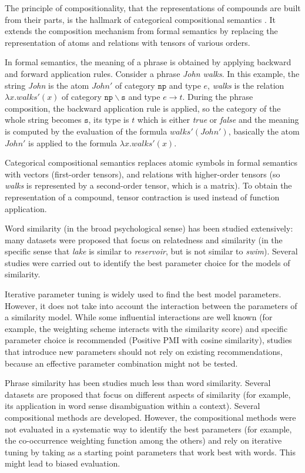 The principle of compositionality, that the representations of compounds are built from their parts, is the hallmark of categorical compositional semantics \cite{DBLP:journals/corr/abs-1003-4394}. It extends the composition mechanism from formal semantics by replacing the representation of atoms and relations with tensors of various orders.

In formal semantics, the meaning of a phrase is obtained by applying backward and forward application rules. Consider a phrase \textit{John walks}. In this example, the string \textit{John} is the atom $\mathit{John'}$ of category $\mathtt{np}$ and type $e$, \textit{walks} is the relation $\lambda x.\mathit{walks'}(x)$ of category $\mathtt{np\backslash{}s}$ and type $e \to t$. During the phrase composition, the backward application rule is applied, so the category of the whole string becomes $\mathtt{s}$, its type is $t$ which is either \textit{true} or \textit{false} and the meaning is computed by the evaluation of the formula $\mathit{walks'}(\mathit{John'})$, basically the atom $\mathit{John'}$ is applied to the formula $\lambda x.\mathit{walks'(x)}$.

Categorical compositional semantics replaces atomic symbols in formal semantics with vectors (first-order tensors), and relations with higher-order tensors (so \textit{walks} is represented by a second-order tensor, which is a matrix). To obtain the representation of a compound, tensor contraction is used instead of function application.

Word similarity (in the broad psychological sense) has been studied extensively: many datasets were proposed that focus on relatedness and similarity (in the specific sense that \textit{lake} is similar to \textit{reservoir}, but is not similar to \textit{swim}). Several studies were carried out to identify the best parameter choice for the models of similarity.

Iterative parameter tuning is widely used to find the best model parameters. However, it does not take into account the interaction between the parameters of a similarity model. While some influential interactions are well known (for example, the weighting scheme interacts with the similarity score) and specific parameter choice is recommended (Positive PMI with cosine similarity), studies that introduce new parameters should not rely on existing recommendations, because an effective parameter combination might not be tested.

Phrase similarity has been studies much less than word similarity. Several datasets  are proposed that focus on different aspects of similarity (for example, its application in word sense disambiguation within a context). Several compositional methods are developed. However, the compositional methods were not evaluated in a systematic way to identify the best parameters (for example, the co-occurrence weighting function among the others) and rely on iterative tuning by taking as a starting point parameters that work best with words. This might lead to biased evaluation.

